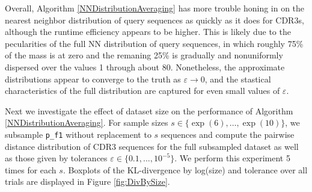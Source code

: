 \documentclass{article}
\begin{document}
Overall, Algorithm \ref{NNDistributionAveraging} has more trouble honing in on the nearest neighbor distribution of query sequences as quickly as it does for CDR3s, although the runtime efficiency appears to be higher.
This is likely due to the pecularities of the full NN distribution of query sequences, in which roughly 75\% of the mass is at zero and the remaning 25\% is gradually and nonuniformly dispersed over the values 1 through about 80.
Nonetheless, the approximate distributions appear to converge to the truth as $\varepsilon \to 0$, and the stastical characteristics of the full distribution are captured for even small values of $\varepsilon$.


Next we investigate the effect of dataset size on the performance of Algorithm \ref{NNDistributionAveraging}.
For sample sizes $s \in \{\exp(6), \dots, \exp(10)\}$, we subsample \texttt{p\_f1} without replacement to $s$ sequences and compute the pairwise distance distribution of CDR3 sequences for the full subsampled dataset as well as those given by tolerances $\varepsilon \in \{0.1, ..., 10^{-5}\}$.  
We perform this experiment 5 times for each $s$.
Boxplots of the KL-divergence by log(size) and tolerance over all trials are displayed in Figure \ref{fig:DivBySize}.  
\end{document}
